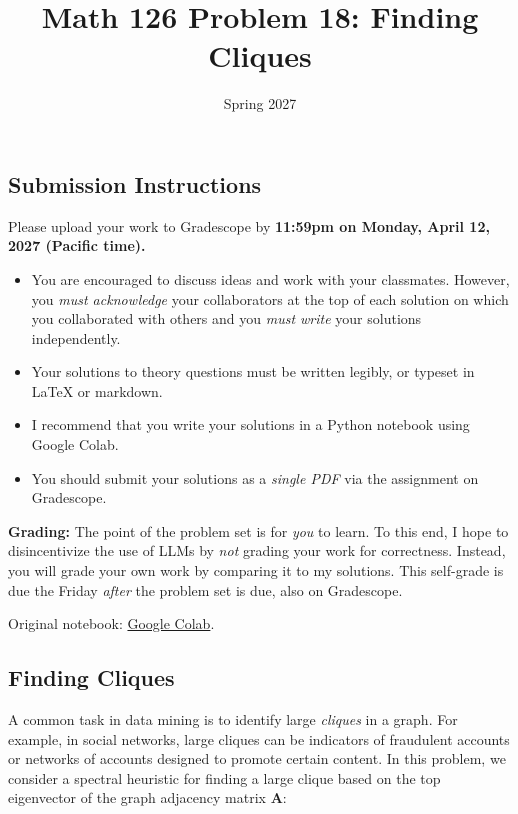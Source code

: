 \documentclass{article}
\title{Math 126 Problem 18: Finding Cliques}
\author{} %
\date{Spring 2027}
\begin{document}
\maketitle

\hypertarget{submission-instructions}{%
\subsection*{Submission Instructions}\label{submission-instructions}}

Please upload your work to Gradescope by \textbf{11:59pm on Monday, April 12, 2027 (Pacific time).}

\begin{itemize}
\item
  You are encouraged to discuss ideas and work with your classmates. However, you \emph{must acknowledge} your collaborators at the top of each solution on which you collaborated with others and you \emph{must write} your solutions independently.
\item
  Your solutions to theory questions must be written legibly, or typeset in LaTeX or markdown.
\item
  I recommend that you write your solutions in a Python notebook using Google Colab.
\item
  You should submit your solutions as a \emph{single PDF} via the assignment on Gradescope.
\end{itemize}

\textbf{Grading:} The point of the problem set is for \emph{you} to learn. To this end, I hope to disincentivize the use of LLMs by \emph{not} grading your work for correctness. Instead, you will grade your own work by comparing it to my solutions. This self-grade is due the Friday \emph{after} the problem set is due, also on Gradescope.

\noindent Original notebook: \href{https://colab.research.google.com/drive/19daxPN0hhRwvyQ3BLb0z7GdGOTqvOVRK?usp=sharing}{Google Colab}.

\hypertarget{finding-cliques}{%
\subsection*{Finding Cliques}\label{finding-cliques}}

A common task in data mining is to identify large \emph{cliques} in a graph. For example, in social networks, large cliques can be indicators of fraudulent accounts or networks of accounts designed to promote certain content. In this problem, we consider a spectral heuristic for finding a large clique based on the top eigenvector of the graph adjacency matrix \(\mathbf{A}\):
\end{document}
